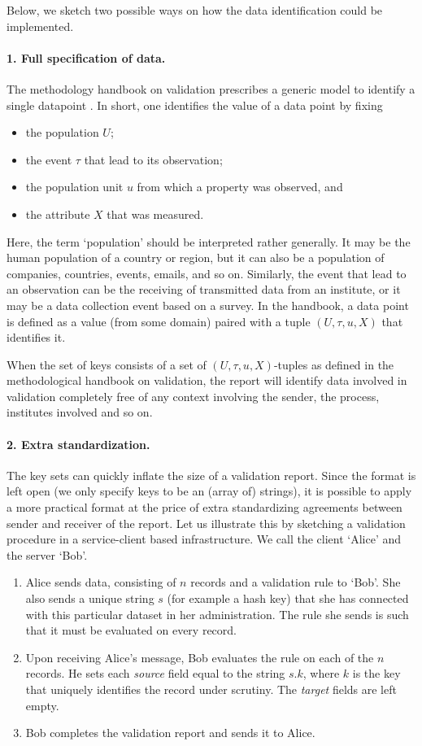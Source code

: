 Below, we sketch two possible ways on how the data identification could be
implemented.

\paragraph{1. Full specification of data.} The methodology handbook on validation
prescribes a generic model to identify a single datapoint
\citep[Chapter~5]{zio2015methodology}. In short, one identifies the value of a
data point by fixing
\begin{itemize}
\item the population $U$;
\item the event $\tau$ that lead to its observation;
\item the population unit $u$ from which a property was observed, and
\item the attribute $X$ that was measured.
\end{itemize}
Here, the term `population' should be interpreted rather generally. It may be
the human population of a country or region, but it can also be a population of
companies, countries, events, emails, and so on. Similarly, the event that lead
to an observation can be the receiving of transmitted data from an institute,
or it may be a data collection event based on a survey.  In the handbook, a
data point is defined as a value (from some domain) paired with a tuple
$(U,\tau,u,X)$ that identifies it.


When the set of keys consists of a set of $(U,\tau,u,X)$-tuples as defined in
the methodological handbook on validation, the report will identify data
involved in validation completely free of any context involving the sender, the
process, institutes involved and so on. 

\paragraph{2. Extra standardization.} The key sets can quickly inflate the size
of a validation report. Since the format is left open (we only specify keys to
be an (array of) strings), it is possible to apply a more practical format at
the price of extra standardizing agreements between sender and receiver of the
report. Let us illustrate this by sketching a validation procedure in a service-client
based infrastructure. We call the client `Alice' and the server `Bob'.
\begin{enumerate}[noitemsep]
\item Alice sends data, consisting of $n$ records and a validation rule to `Bob'.
She also sends a unique string $s$ (for example a hash key) that she has connected
with this particular dataset in her administration. The rule she sends is such that
it must be evaluated on every record.
\item Upon receiving Alice's message, Bob evaluates the rule on each of the $n$
records. He sets each \emph{source} field equal to the string $s.k$, where $k$
is the key that uniquely identifies the record under scrutiny. The \emph{target}
fields are left empty.
\item Bob completes the validation report and sends it to Alice.
\end{enumerate}

